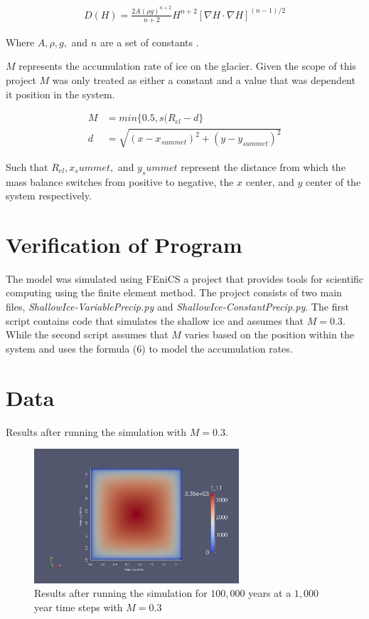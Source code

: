 \documentclass{article}%
\begin{document}
    \begin{align}
        D(H) = \frac{2A(\rho g)^{n + 2}}{n + 2}  H^{n + 2}  \left[ \nabla H \cdot \nabla H\right]^{(n - 1)/2}
    \end{align}
    
    Where $A, \rho, g,$ and $n$ are a set of constants \cite{3}. 

    $M$ represents the accumulation rate of ice on the glacier. Given the scope of this project $M$ was only treated as either a constant and a value that was dependent it position in the system.  

    \begin{align}
        M &= min\{ 0.5, s(R_{el} - d\} \\
        d &= \sqrt{(x - x_{summet})^2 + (y - y_{summet})^2}
    \end{align}

    Such that $R_{el}, x_summet,$ and $y_summet$ represent the distance from which the mass balance switches from positive to negative, the $x$ center, and $y$ center of the system respectively. 

    \section{Verification of Program}

    The model was simulated using FEniCS a project that provides tools for scientific computing using the finite element method. The project consists of two main files, {\it ShallowIce-VariablePrecip.py} and {\it ShallowIce-ConstantPrecip.py}. The first script contains code that simulates the shallow ice and assumes that $M = 0.3$. While the second script assumes that $M$ varies based on the position within the system and uses the formula (6) to model the accumulation rates.  

    \section{Data}
    Results after running the simulation with $M = 0.3$. 

    \begin{figure}[ht!]
        \centering
        \includegraphics[width=3in]{../img/constant-accumulation.png} 
        \caption{ Results after running the simulation for $100,000$ years at a $1,000$ year time steps with $M = 0.3$ }
        \label{constant}
    \end{figure}
\end{document}
